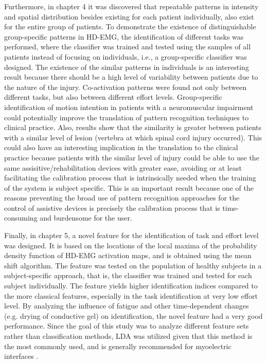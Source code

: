 Furthermore, in chapter 4 it was discovered that repeatable patterns in intensity and spatial distribution besides existing for each patient individually, also exist for the entire group of patients. To demonstrate the existence of distinguishable group-specific patterns in HD-EMG, the identification of different tasks was performed, where the classifier was trained and tested using the samples of all patients instead of focusing on individuals, i.e., a group-specific classifier was designed. The existence of the similar patterns in individuals is an interesting result because there should be a high level of variability between patients due to the nature of the injury. Co-activation patterns were found not only between different tasks, but also between different effort levels. Group-specific identification of motion intention in patients with a neuromuscular impairment could potentially improve the translation of pattern recognition techniques to clinical practice. Also, results show that the similarity is greater between patients with a similar level of lesion (vertebra at which spinal cord injury occurred). This could also have an interesting implication in the translation to the clinical practice because patients with the similar level of injury could be able to use the same assisitive/rehabilitation devices with greater ease, avoiding or at least facilitating the calibration process that is intrinsically needed when the training of the system is subject specific. This is an important result because one of the reasons preventing the broad use of pattern recognition approaches for the control of assistive devices is precisely the calibration process that is time-consuming and burdensome for the user.

Finally, in chapter 5, a novel feature for the identification of task and effort level was designed. It is based on the locations of the local maxima of the probability density function of HD-EMG activation maps, and is obtained using the mean shift algorithm. The feature was tested on the population of healthy subjects in a subject-specific approach, that is, the classifier was trained and tested for each subject individually. The feature yields higher identification indices compared to the more classical features, especially in the task identification at very low effort level. By analyzing the influence of fatigue and other time-dependent changes (e.g. drying of conductive gel) on identification, the novel feature had a very good performance. Since the goal of this study was to analyze different feature sets rather than classification methods, LDA was utilized given that this method is the most commonly used, and is generally recommended for myoelectric interfaces \citep{Hakonen2015}.

